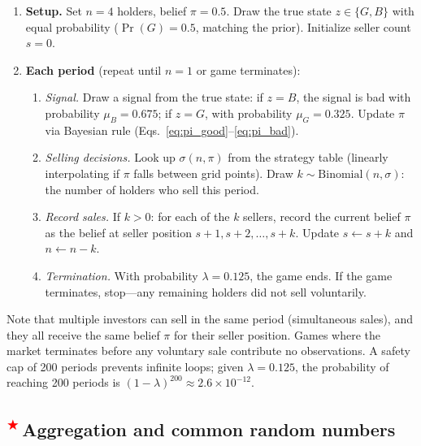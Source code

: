 \documentclass[11pt]{article}
\newcommand{\extension}{\textsuperscript{\textcolor{red}{$\bigstar$}}\,}
\begin{document}
\begin{enumerate}
    \item \textbf{Setup.} Set $n = 4$ holders, belief $\pi = 0.5$. Draw the
          true state $z \in \{G, B\}$ with equal probability ($\Pr(G) = 0.5$,
          matching the prior). Initialize seller count $s = 0$.

    \item \textbf{Each period} (repeat until $n = 1$ or game terminates):
    \begin{enumerate}
        \item \textit{Signal.} Draw a signal from the true state: if $z = B$,
              the signal is bad with probability $\mu_B = 0.675$; if $z = G$,
              with probability $\mu_G = 0.325$. Update $\pi$ via Bayesian
              rule (Eqs.~\eqref{eq:pi_good}--\eqref{eq:pi_bad}).

        \item \textit{Selling decisions.} Look up $\sigma(n, \pi)$ from the
              strategy table (linearly interpolating if $\pi$ falls between
              grid points). Draw $k \sim \text{Binomial}(n, \sigma)$: the
              number of holders who sell this period.

        \item \textit{Record sales.} If $k > 0$: for each of the $k$ sellers,
              record the current belief $\pi$ as the belief at seller position
              $s + 1, s + 2, \ldots, s + k$. Update $s \leftarrow s + k$ and
              $n \leftarrow n - k$.

        \item \textit{Termination.} With probability $\lambda = 0.125$, the
              game ends. If the game terminates, stop---any remaining holders
              did not sell voluntarily.
    \end{enumerate}
\end{enumerate}

Note that multiple investors can sell in the same period (simultaneous sales),
and they all receive the same belief $\pi$ for their seller position. Games
where the market terminates before any voluntary sale contribute no
observations. A safety cap of 200 periods prevents infinite loops; given
$\lambda = 0.125$, the probability of reaching 200 periods is
$(1-\lambda)^{200} \approx 2.6 \times 10^{-12}$.

\subsection{\extension Aggregation and common random numbers}
\end{document}
